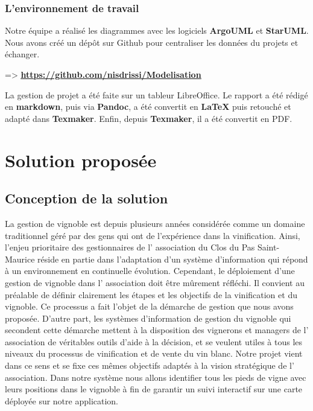 \documentclass[a4paper, titlepage]{report}
\begin{document}
\clearpage
\subsection{L'environnement de travail}

Notre équipe a réalisé les diagrammes avec les logiciels
\textbf{ArgoUML} et \textbf{StarUML}. Nous avons créé un dépôt sur
Github pour centraliser les données du projets et échanger.

=\textgreater{}
\href{https://github.com/nisdrissi/Modelisation}
{%
	\textbf{%
		\underline{https://github.com/nisdrissi/Modelisation}%
	}%
}

La gestion de projet a été faite sur un tableur LibreOffice. Le rapport
a été rédigé en \textbf{markdown}, puis via \textbf{Pandoc}, a été
convertit en \textbf{LaTeX} puis retouché et adapté dans \textbf{Texmaker}. Enfin, depuis \textbf{Texmaker}, il a été convertit en PDF.

\chapter{Solution proposée}

\section{Conception de la solution}

La gestion de vignoble est depuis plusieurs années considérée comme un
domaine traditionnel géré par des gens qui ont de l'expérience dans la
vinification. Ainsi, l'enjeu prioritaire des gestionnaires de l'
association du Clos du Pas Saint-Maurice réside en partie dans
l'adaptation d'un système d'information qui répond à un environnement en
continuelle évolution. Cependant, le déploiement d'une gestion de
vignoble dans l' association doit être mûrement réfléchi. Il convient au
préalable de définir clairement les étapes et les objectifs de la
vinification et du vignoble. Ce processus a fait l'objet de la démarche
de gestion que nous avons proposée. D'autre part, les systèmes
d'information de gestion du vignoble qui secondent cette démarche
mettent à la disposition des vignerons et managers de l' association de
véritables outils d'aide à la décision, et se veulent utiles à tous les
niveaux du processus de vinification et de vente du vin blanc. Notre
projet vient dans ce sens et se fixe ces mêmes objectifs adaptés à la
vision stratégique de l' association. Dans notre système nous allons
identifier tous les pieds de vigne avec leurs positions dans le vignoble
à fin de garantir un suivi interactif sur une carte déployée sur notre
application.
\end{document}
